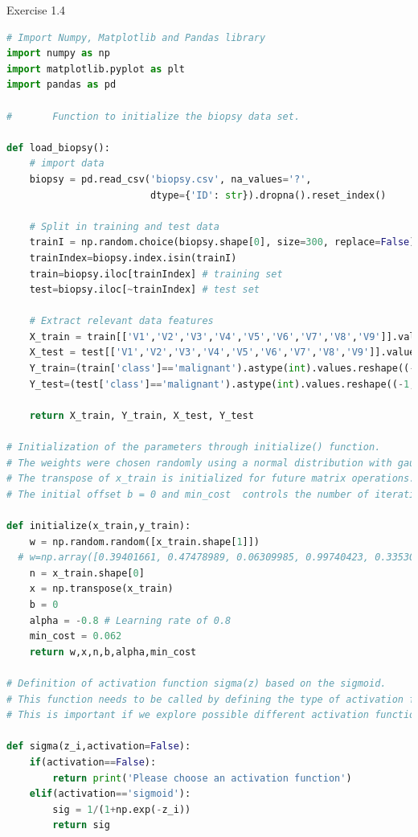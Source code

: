 \documentclass{article}
\begin{document}
Exercise 1.4
\begin{lstlisting}[language=Python]
# Import Numpy, Matplotlib and Pandas library
import numpy as np
import matplotlib.pyplot as plt
import pandas as pd

#		Function to initialize the biopsy data set.

def load_biopsy():
    # import data
    biopsy = pd.read_csv('biopsy.csv', na_values='?', 
                         dtype={'ID': str}).dropna().reset_index()
    
    # Split in training and test data
    trainI = np.random.choice(biopsy.shape[0], size=300, replace=False)    
    trainIndex=biopsy.index.isin(trainI)    
    train=biopsy.iloc[trainIndex] # training set
    test=biopsy.iloc[~trainIndex] # test set    
    
    # Extract relevant data features
    X_train = train[['V1','V2','V3','V4','V5','V6','V7','V8','V9']].values
    X_test = test[['V1','V2','V3','V4','V5','V6','V7','V8','V9']].values    
    Y_train=(train['class']=='malignant').astype(int).values.reshape((-1,1))
    Y_test=(test['class']=='malignant').astype(int).values.reshape((-1,1))
    
    return X_train, Y_train, X_test, Y_test

# Initialization of the parameters through initialize() function. 
# The weights were chosen randomly using a normal distribution with gaussians.
# The transpose of x_train is initialized for future matrix operations. 
# The initial offset b = 0 and min_cost  controls the number of iterations to minimize the cost function by breaking the self-consistent loop when the cost function is lower than 0.062

def initialize(x_train,y_train):
    w = np.random.random([x_train.shape[1]])
  # w=np.array([0.39401661, 0.47478989, 0.06309985, 0.99740423, 0.33530285,0.60437357, 0.74371789, 0.3407668 , 0.81388953]) # Initial parameters generated randomly.
    n = x_train.shape[0]
    x = np.transpose(x_train)
    b = 0
    alpha = -0.8 # Learning rate of 0.8
    min_cost = 0.062
    return w,x,n,b,alpha,min_cost

# Definition of activation function sigma(z) based on the sigmoid. 
# This function needs to be called by defining the type of activation function. i.e sigma(z,activation='sigmoid'). 
# This is important if we explore possible different activation functions in the next assignments.

def sigma(z_i,activation=False):
    if(activation==False):
        return print('Please choose an activation function')
    elif(activation=='sigmoid'):
        sig = 1/(1+np.exp(-z_i))
        return sig
        

\end{lstlisting}
\end{document}
